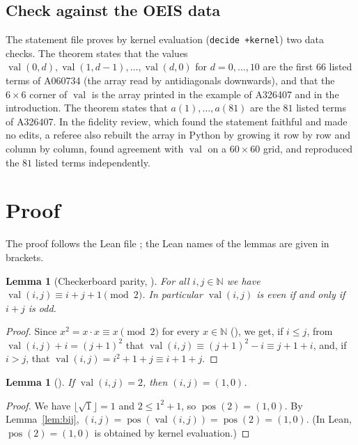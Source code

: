 \documentclass[11pt]{amsart}
\theoremstyle{plain}
\newtheorem{lemma}[theorem]{Lemma}
\theoremstyle{definition}
\newcommand{\N}{\mathbb{N}}
\newcommand{\val}{\operatorname{val}}
\newcommand{\pos}{\operatorname{pos}}
\begin{document}
\subsection*{Check against the OEIS data}
The statement file proves by kernel evaluation (\texttt{decide +kernel}) two data checks.
The theorem  states that the values $\val(0,d),\val(1,d-1),\dots,\val(d,0)$ for $d=0,\dots,10$ are the first $66$ listed terms of A060734 (the array read by antidiagonals downwards), and that the $6\times6$ corner of $\val$ is the array printed in the example of A326407 and in the introduction.
The theorem  states that $a(1),\dots,a(81)$ are the $81$ listed terms of A326407.
In the fidelity review, which found the statement faithful and made no edits, a referee also rebuilt the array in Python by growing it row by row and column by column, found agreement with $\val$ on a $60\times60$ grid, and reproduced the $81$ listed terms independently.

\section{Proof}\label{sec:proof}

The proof follows the Lean file ; the Lean names of the lemmas are given in brackets.

\begin{lemma}[Checkerboard parity, ]\label{lem:parity}
For all $i,j\in\N$ we have $\val(i,j)\equiv i+j+1\pmod 2$.
In particular $\val(i,j)$ is even if and only if $i+j$ is odd.
\end{lemma}

\begin{proof}
Since $x^2=x\cdot x\equiv x\pmod 2$ for every $x\in\N$ (), we get, if $i\le j$, from $\val(i,j)+i=(j+1)^2$ that $\val(i,j)\equiv (j+1)^2-i\equiv j+1+i$, and, if $i>j$, that $\val(i,j)=i^2+1+j\equiv i+1+j$.
\end{proof}

\begin{lemma}[]\label{lem:two}
If $\val(i,j)=2$, then $(i,j)=(1,0)$.
\end{lemma}

\begin{proof}
We have $\lfloor\sqrt{1}\rfloor=1$ and $2\le1^2+1$, so $\pos(2)=(1,0)$.
By Lemma~\ref{lem:bij}, $(i,j)=\pos(\val(i,j))=\pos(2)=(1,0)$.
(In Lean, $\pos(2)=(1,0)$ is obtained by kernel evaluation.)
\end{proof}
\end{document}
